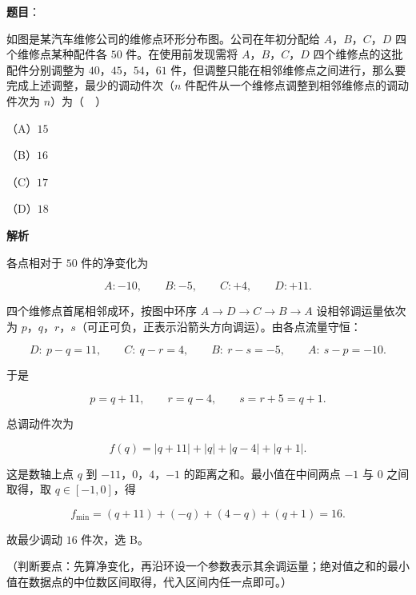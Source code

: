 \begin{answer}

\textbf{题目}：

如图是某汽车维修公司的维修点环形分布图。公司在年初分配给 $A$，$B$，$C$，$D$ 四个维修点某种配件各 $50$ 件。在使用前发现需将 $A$，$B$，$C$，$D$ 四个维修点的这批配件分别调整为 $40$，$45$，$54$，$61$ 件，但调整只能在相邻维修点之间进行，那么要完成上述调整，最少的调动件次（$n$ 件配件从一个维修点调整到相邻维修点的调动件次为 $n$）为（　）
\nopagebreak[4]
\begin{center}\end{center}
\nopagebreak[4]
（A）$15$

（B）$16$

（C）$17$

（D）$18$

\textbf{解析}

各点相对于 $50$ 件的净变化为

\nopagebreak[4]
\[A:-10,\qquad B:-5,\qquad C:+4,\qquad D:+11.\]

四个维修点首尾相邻成环，按图中环序 $A\to D\to C\to B\to A$ 设相邻调运量依次为 $p$，$q$，$r$，$s$（可正可负，正表示沿箭头方向调运）。由各点流量守恒：

\nopagebreak[4]
\[D:\ p-q=11,\qquad C:\ q-r=4,\qquad B:\ r-s=-5,\qquad A:\ s-p=-10.\]

于是

\nopagebreak[4]
\[p=q+11,\qquad r=q-4,\qquad s=r+5=q+1.\]

总调动件次为

\nopagebreak[4]
\[f(q)=|q+11|+|q|+|q-4|+|q+1|.\]

这是数轴上点 $q$ 到 $-11$，$0$，$4$，$-1$ 的距离之和。最小值在中间两点 $-1$ 与 $0$ 之间取得，取 $q\in[-1,0]$，得

\nopagebreak[4]
\[f_{\min}=(q+11)+(-q)+(4-q)+(q+1)=16.\]

故最少调动 $16$ 件次，选 B。

（判断要点：先算净变化，再沿环设一个参数表示其余调运量；绝对值之和的最小值在数据点的中位数区间取得，代入区间内任一点即可。）


\end{answer}
